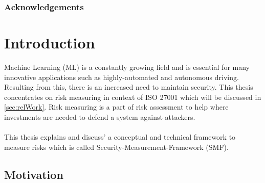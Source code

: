 \begin{abstract}

\end{abstract}

\subsubsection*{Acknowledgements}

\newpage

\section{Introduction}
\label{sec:intro}

Machine Learning (ML) is a constantly growing field and is essential for many innovative
applications such as highly-automated and autonomous driving. Resulting from this,
there is an increased need to maintain security. This thesis concentrates on risk
measuring in context of ISO 27001 which will be discussed in \ref{sec:relWork}. Risk
measuring is a part of risk assessment to help where investments are needed to
defend a system against attackers. \\ \\
This thesis explains and discuss' a conceptual and technical framework to measure
risks which is called Security-Measurement-Framework (SMF).

\subsection{Motivation}

